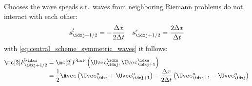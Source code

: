 \begin{defnbox}\nospacing
    \begin{defn}\label{defn:lax_friedrichs_scheme_system}
        Chooses the wave speeds s.t.\ waves from neighboring Riemann problems do not interact with each other:
        \begin{align}
          s_{\idxj+1/2}^{l}=-\frac{\Delta x}{2\Delta t}&&s_{\idxj+1/2}^{r}=\frac{2\Delta x}{\Delta t}
        \end{align}
        with \cref{eq:central_scheme_symmetric_waves} it follows:
        \begin{align}
          \Fluxvec_{\idxj+1/2}^{\idxn}&=\Fluxvec^{\text{LxF}}\left(\Uvec^{\idxn}_{\idxj},\Uvec^{\idxn}_{\idxj+1}\right)\\[-1\jot]
          &=\frac{1}{2}\Avec \left(\Uvec_{\idxj}^{n}+\Uvec_{\idxj+1}^{n}\right)-\frac{\Delta x}{2\Delta t}\left(\Uvec_{\idxj+1}^{n}-\Uvec_{\idxj}^{n}\right)\nonumber
        \end{align}
    \end{defn}
\end{defnbox}
